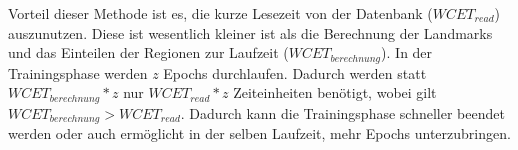 Vorteil dieser Methode ist es, die kurze Lesezeit von der Datenbank ($WCET_{read}$) auszunutzen. Diese ist wesentlich kleiner ist als die Berechnung der Landmarks und das Einteilen der Regionen zur Laufzeit ($WCET_{berechnung}$). In der Trainingsphase werden $z$ Epochs durchlaufen. Dadurch werden statt  $WCET_{berechnung} * z$ nur $WCET_{read} * z$ Zeiteinheiten benötigt, wobei gilt $WCET_{berechnung} > WCET_{read}$. Dadurch kann die Trainingsphase schneller beendet werden oder auch ermöglicht in der selben Laufzeit, mehr Epochs unterzubringen.

































